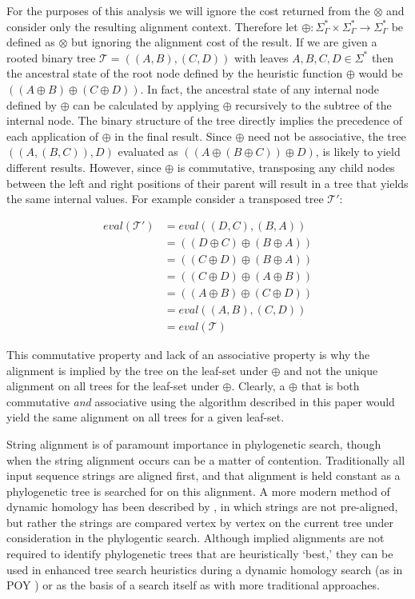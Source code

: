 \documentclass{bmcart}
\begin{document}
For the purposes of this analysis we will ignore the cost returned from the $\otimes$ and consider only the resulting alignment context.
Therefore let $\oplus : \Sigma^{*}_{\Gamma} \times \Sigma^{*}_{\Gamma} \rightarrow \Sigma^{*}_{\Gamma}$ be defined as $\otimes$ but ignoring the alignment cost of the result. If we are given a rooted binary tree $\mathcal{T} = ((A,B),(C,D))$ with leaves $A, B, C, D \in \Sigma^{*}$ then the ancestral state of the root node defined by the heuristic function $\oplus$ would be $((A \oplus B) \oplus (C \oplus D))$. 
In fact, the ancestral state of any internal node defined by $\oplus$ can be calculated by applying $\oplus$ recursively to the subtree of the internal node.
The binary structure of the tree directly implies the precedence of each application of $\oplus$ in the final result.
Since $\oplus$ need not be associative, the tree $((A,(B,C)),D)$ evaluated as $((A \oplus (B \oplus C)) \oplus D)$, is likely to yield different results.
However, since $\oplus$ is commutative, transposing any child nodes between the left and right positions of their parent will result in a tree that yields the same internal values. 
For example consider a transposed tree $\mathcal{T'}$:

\begin{align*}
  eval(\mathcal{T'}) &= eval((D,C),(B,A))
\\  &= ((D \oplus C) \oplus (B \oplus A))
\\  &= ((C \oplus D) \oplus (B \oplus A))
\\  &= ((C \oplus D) \oplus (A \oplus B))
\\  &= ((A \oplus B) \oplus (C \oplus D))
\\  &= eval((A,B),(C,D))
\\  &= eval(\mathcal{T})
\end{align*}

This commutative property and lack of an associative property is why the alignment is implied by the tree on the leaf-set under $\oplus$ and not the unique alignment on all trees for the leaf-set under $\oplus$.
Clearly, a $\oplus$ that is both commutative \emph{and} associative using the algorithm described in this paper would yield the same alignment on all trees for a given leaf-set.

String alignment is of paramount importance in phylogenetic search, though when the string alignment occurs can be a matter of contention.
Traditionally all input sequence strings are aligned first, and that alignment is held constant as a phylogenetic tree is searched for on this alignment.
A more modern method of dynamic homology has been described by \citep{Wheeler1996}, in which strings are not pre-aligned, but rather the strings are compared vertex by vertex on the current tree under consideration in the phylogentic search.
Although implied alignments are not required to identify phylogenetic trees that are heuristically `best,' they can be used in enhanced tree search heuristics during a dynamic homology search (as in POY \citealp{POY5, Wheeleretal2015}) or as the basis of a search itself as with more traditional approaches.
\end{document}
